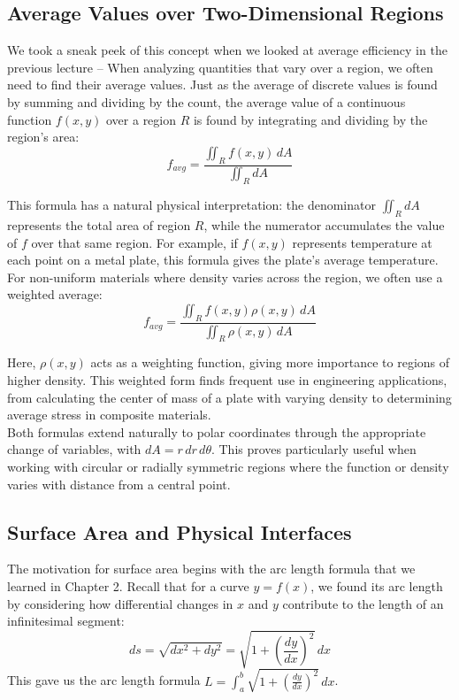 \subsection*{Average Values over Two-Dimensional Regions}  

\noindent We took a sneak peek of this concept when we looked at average efficiency in the previous lecture -- When analyzing quantities that vary over a region, we often need to find their average values. Just as the average of discrete values is found by summing and dividing by the count, the average value of a continuous function $f(x,y)$ over a region $R$ is found by integrating and dividing by the region's area:
\[
f_{avg} = \frac{\iint_R f(x,y)\,dA}{\iint_R dA}
\]

\noindent This formula has a natural physical interpretation: the denominator $\iint_R dA$ represents the total area of region $R$, while the numerator accumulates the value of $f$ over that same region. For example, if $f(x,y)$ represents temperature at each point on a metal plate, this formula gives the plate's average temperature. \\

\noindent For non-uniform materials where density varies across the region, we often use a weighted average:
\[
f_{avg} = \frac{\iint_R f(x,y)\rho(x,y)\,dA}{\iint_R \rho(x,y)\,dA}
\]

\noindent Here, $\rho(x,y)$ acts as a weighting function, giving more importance to regions of higher density. This weighted form finds frequent use in engineering applications, from calculating the center of mass of a plate with varying density to determining average stress in composite materials. \\

\noindent Both formulas extend naturally to polar coordinates through the appropriate change of variables, with $dA = r\,dr\,d\theta$. This proves particularly useful when working with circular or radially symmetric regions where the function or density varies with distance from a central point.

\subsection*{Surface Area and Physical Interfaces} 

\noindent The motivation for surface area begins with the arc length formula that we learned in Chapter 2. Recall that for a curve $y = f(x)$, we found its arc length by considering how differential changes in $x$ and $y$ contribute to the length of an infinitesimal segment:
\[
ds = \sqrt{dx^2 + dy^2} = \sqrt{1 + \left(\frac{dy}{dx}\right)^2}\,dx
\]
This gave us the arc length formula $L = \int_a^b \sqrt{1 + \left(\frac{dy}{dx}\right)^2}\,dx$. \\

